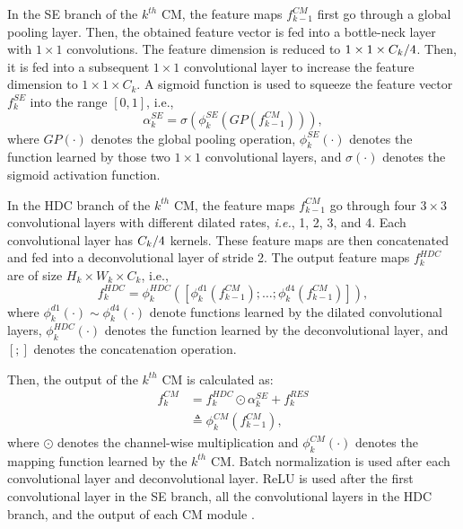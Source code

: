 \documentclass[twocolumn]{svjour3}          \smartqed  \usepackage{natbib}
\begin{document}
In the SE branch of the $k^{th}$ CM, the feature maps $f_{k-1}^{CM}$ first go through a global pooling layer. Then, the obtained feature vector is fed into a bottle-neck layer with $1 \times 1$ convolutions. The feature dimension is reduced to $1 \times 1 \times {{{C_k}} \mathord{\left/
 {\vphantom {{{C_k}} 4}} \right.
 \kern-\nulldelimiterspace} 4}$. Then, it is fed into a subsequent $1 \times 1$ convolutional layer to increase the feature dimension to $1 \times 1 \times C_{k}$. A sigmoid function is used to squeeze the feature vector $f_k^{SE}$ into the range $\left[ {0,1} \right]$, i.e.,
\begin{equation}
\alpha_k^{SE} = \sigma \left( \phi_k^{SE} \left( GP \left( f_{k-1}^{CM} \right) \right) \right),
\label{eq:feat_se}
\end{equation}
where $GP\left(\cdot\right)$ denotes the global pooling operation, $\phi_k^{SE}\left(\cdot\right)$ denotes the function learned by those two $1 \times 1$ convolutional layers, and $\sigma\left(\cdot\right)$ denotes the sigmoid activation function.

In the HDC branch of the $k^{th}$ CM, the feature maps $f_{k-1}^{CM}$ go through four $3 \times 3$ convolutional layers with different dilated rates, \emph{i.e.}, 1, 2, 3, and 4. Each convolutional layer has ${{{C_k}} \mathord{\left/
 {\vphantom {{{C_k}} 4}} \right.
 \kern-\nulldelimiterspace} 4}$ kernels. These feature maps are then concatenated and fed into a deconvolutional layer of stride 2. The output feature maps $f_k^{HDC}$
are of size $H_k \times W_k \times C_k$, i.e.,
\begin{equation}
f_k^{HDC} = \phi_k^{HDC} \left( \left [ \phi_k^{d1} \left( f_{k-1}^{CM} \right);\dots;\phi_k^{d4} \left( f_{k-1}^{CM} \right) \right ] \right),
\label{eq:feat_hdc}
\end{equation}
where $\phi_k^{d1}\left(\cdot\right) \sim \phi_k^{d4}\left(\cdot\right)$ denote functions learned by the dilated convolutional layers, $\phi_k^{HDC}\left(\cdot\right)$ denotes the function learned by the deconvolutional layer, and $\left [ ; \right ]$ denotes the concatenation operation.

Then, the output of the $k^{th}$ CM is calculated as:
\begin{align}\nonumber
f_k^{CM} &= f_k^{HDC} \odot \alpha_k^{SE} + f_k^{RES}\\
    &\triangleq \phi_k^{CM} \left( f_{k-1}^{CM} \right),
\label{eq:feat_cam}
\end{align}
where $\odot$ denotes the channel-wise multiplication and $\phi_k^{CM} \left(\cdot\right)$ denotes the mapping function learned by the $k^{th}$ CM. Batch normalization \citep{ioffe2015batch} is used after each convolutional layer and deconvolutional layer. ReLU is used after the first convolutional layer in the SE branch, all the convolutional layers in the HDC branch, and the output of each CM module \citep{krizhevsky2012imagenet}.
\end{document}
